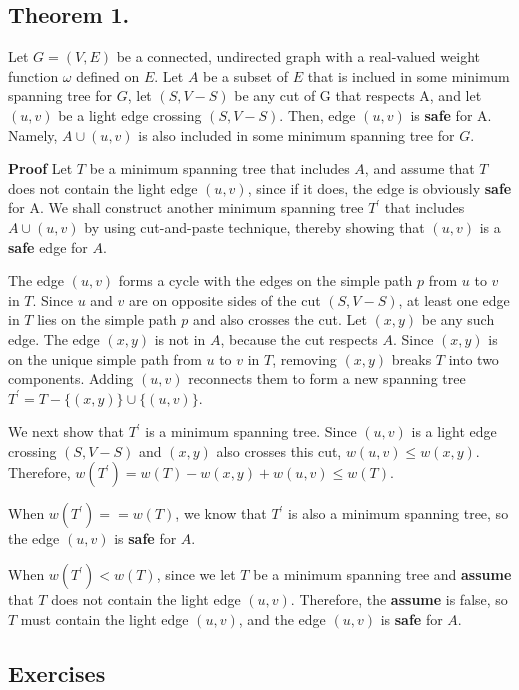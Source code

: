 \subsection {Theorem 1.}

Let $G=(V, E)$ be a connected, undirected graph with a real-valued weight
function $\omega$ defined on $E$. Let $A$ be a subset of $E$ that is inclued in
some minimum spanning tree for $G$, let $(S, V - S)$ be any cut of G that
respects A, and let $(u, v)$ be a light edge crossing $(S, V - S)$. Then, edge
$(u, v)$ is \textbf{safe} for A. {\color{red} Namely, $ A \cup {(u, v)}$ is also
included in some minimum spanning tree for $G$.}

\textbf{Proof} Let $T$ be a minimum spanning tree that includes $A$, and
{\color{red}assume that $T$ does not contain the light edge $(u, v)$}, since if
it does, the edge is obviously \textbf{safe} for A. We shall construct another
minimum spanning tree $T^{'}$ that includes $A \cup {(u, v)}$ by using
cut-and-paste technique, thereby showing that $(u, v)$ is a \textbf{safe} edge
for $A$.

The edge $(u, v)$ forms a {\color{red}cycle} with the edges on the simple path
$p$ from $u$ to $v$ in $T$. Since $u$ and $v$ are on opposite sides of the cut
$(S, V - S)$, at least one edge in $T$ lies on the simple path $p$ and also
crosses the cut. Let $(x, y)$ be any such edge. The edge $(x, y)$ is not in $A$,
because the cut respects $A$. Since $(x, y)$ is on the unique simple path from
$u$ to $v$ in $T$, removing $(x, y)$ breaks $T$ into two components. Adding
$(u, v)$ reconnects them to form a new spanning tree
$T^{'} = T - \{(x, y)\} \cup \{(u, v)\}$.

We next show that $T^{'}$ is a minimum spanning tree. Since $(u, v)$ is a light
edge crossing $(S, V - S)$ and $(x, y)$ also crosses this cut,
$w(u, v) \leq  w(x, y)$. Therefore,
$w(T^{'}) = w(T) - w(x, y) + w(u, v) \leq w(T)$.

When $w(T^{'}) == w(T)$, we know that $T^{'}$ is also a minimum spanning tree,
so the edge $(u, v)$ is \textbf{safe} for $A$.

When $w(T^{'}) < w(T)$, since we let $T$ be a minimum spanning tree and
\textbf{assume} that $T$ does not contain the light edge $(u, v)$. Therefore,
the \textbf{assume} is false, so $T$ must contain the light edge $(u, v)$, and
the edge $(u, v)$ is \textbf{safe} for $A$.

\subsection{Exercises}


